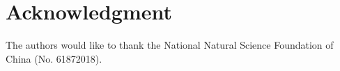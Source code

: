 \documentclass[journal]{IEEEtran}
\begin{document}
%
%
%
%

    \section*{Acknowledgment}
    The authors would like to thank the National Natural Science Foundation of China (No. 61872018).


    \ifCLASSOPTIONcaptionsoff
    \newpage
    \fi




%
%
%
%
%
    
    
% 
\end{document}
